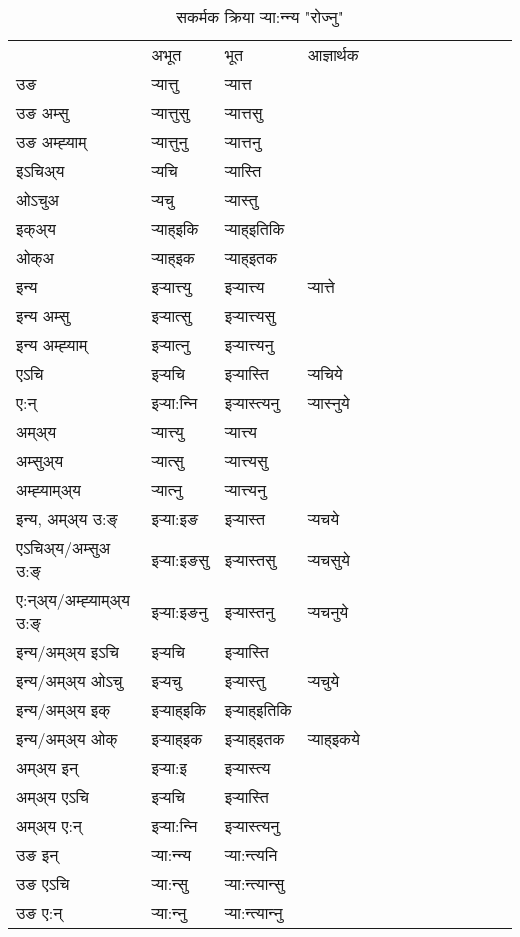 \begin{table}[H]
\centering
\caption{\label{ɛtt.vt} सकर्मक क्रिया  र्‍या:न्‍न्य  "रोज्नु"  }
\begin{tabular}{l|l|l|l|l|l|l|l|l|l|l|l|l}  \toprule
&अभूत & भूत & आज्ञार्थक \\ 
उङ &र्‍यात्तु &र्‍यात्त \\ 
उङ अम्सु&र्‍यात्तुसु &र्‍यात्तसु \\ 
उङ अम्ह्‍याम्&र्‍यात्तुनु &र्‍यात्तनु \\ 
इऽचिअ्य &र्‍यचि &र्‍यास्ति   \\ 
ओऽचुअ        &र्‍यचु &र्‍यास्तु   \\ 
इक्अ्य&र्‍याह्इकि &र्‍याह्इतिकि   \\ 
ओक्अ &र्‍याह्इक &र्‍याह्इतक   \\ 
इन्य & इर्‍यात्त्यु  & इर्‍यात्त्य &र्‍यात्ते  \\ 
इन्य अम्सु& इर्‍यात्सु  & इर्‍यात्त्यसु   \\ 
इन्य अम्ह्‍याम्& इर्‍यात्‍नु  & इर्‍यात्त्यनु   \\ 
एऽचि & इर्‍यचि & इर्‍यास्ति &र्‍यचिये    \\ 
ए:न् & इर्‍या:न्‍नि  & इर्‍यास्त्यनु &र्‍यास्‍नुये  \\ 
अम्अ्य & र्‍यात्त्यु  & र्‍यात्त्य  \\ 
अम्सुअ्य & र्‍यात्सु & र्‍यात्त्यसु  \\ 
अम्ह्‍याम्अ्य & र्‍यात्‍नु  & र्‍यात्त्यनु \\ 
\midrule
इन्य, अम्अ्य उ:ङ्‌ &इर्‍या:इङ &इर्‍यास्त &र्‍यचये \\ 
एऽचिअ्य/अम्सुअ उ:ङ्‌ &इर्‍या:इङसु &इर्‍यास्तसु &र्‍यचसुये \\ 
ए:न्अ्य/अम्ह्‍याम्अ्य उ:ङ्‌ &इर्‍या:इङनु &इर्‍यास्तनु &र्‍यचनुये \\ 
इन्य/अम्अ्य इऽचि &इर्‍यचि &इर्‍यास्ति    \\ 
इन्य/अम्अ्य ओऽचु &इर्‍यचु &इर्‍यास्तु  &र्‍यचुये  \\ 
इन्य/अम्अ्य इक् &इर्‍याह्इकि &इर्‍याह्इतिकि   \\ 
इन्य/अम्अ्य ओक् &इर्‍याह्इक &इर्‍याह्इतक  &र्‍याह्इकये  \\ 
अम्अ्य इन् & इर्‍या:इ & इर्‍यास्त्य   \\ 
अम्अ्य एऽचि & इर्‍यचि & इर्‍यास्ति    \\ 
अम्अ्य ए:न् & इर्‍या:न्‍नि  & इर्‍यास्त्यनु  \\ 
\midrule
उङ इन् & र्‍या:न्‍न्य  & र्‍या:न्त्यनि  \\ 
उङ एऽचि & र्‍या:न्सु  & र्‍या:न्त्यान्सु   \\ 
उङ ए:न्& र्‍या:न्‍नु  & र्‍या:न्त्यान्‍नु   \\ 
\bottomrule
\end{tabular}
\end{table}


